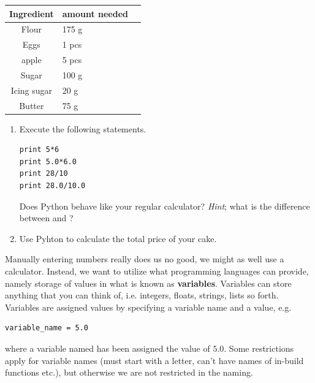 \documentclass{article}
\begin{document}
\begin{center}
    \begin{tabular}{c l l}
    \hline
    Ingredient & amount needed\\
    \hline
    Flour & 175 g \\
    Eggs & 1 pcs \\
    apple & 5 pcs \\
    Sugar & 100 g \\
    Icing sugar &  20 g \\
    Butter & 75 g \\
    \end{tabular}
\end{center}

\begin{enumerate}[resume]

    \item Execute the following statements.
\begin{lstlisting}
print 5*6
print 5.0*6.0
print 28/10
print 28.0/10.0
\end{lstlisting}
    Does Python behave like your regular calculator?
    {\em Hint}; what is the difference between {} and {}? 

    \item Use Pyhton to calculate the total price of your cake.
 
\end{enumerate}


Manually entering numbers really does us no good, we might as well use a calculator.
Instead, we want to utilize what programming languages can provide,
namely storage of values in what is known as {\bf variables}.
Variables can store anything that you can think of, i.e. integers, floats, strings, lists so forth.
Variables are assigned values by specifying a variable name and a value, e.g.

\begin{lstlisting}
variable_name = 5.0
\end{lstlisting}

where a variable named  has been assigned the value
of $5.0$.
Some restrictions apply for variable names (must start with a letter, can't have names of in-build functions etc.), but otherwise we are not restricted in the naming.\\
\end{document}
